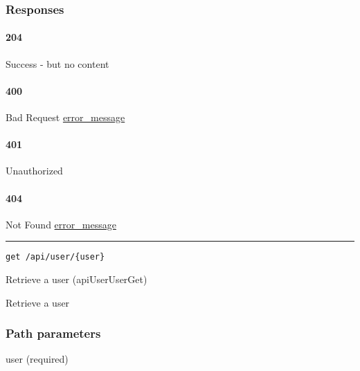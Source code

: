 \hypertarget{responses-129}{%
\subsubsection{Responses}\label{responses-129}}

\hypertarget{section-419}{%
\paragraph{204}\label{section-419}}

Success - but no content \protect\hyperlink{}{}

\hypertarget{section-420}{%
\paragraph{400}\label{section-420}}

Bad Request \protect\hyperlink{error_message}{error\_message}

\hypertarget{section-421}{%
\paragraph{401}\label{section-421}}

Unauthorized \protect\hyperlink{}{}

\hypertarget{section-422}{%
\paragraph{404}\label{section-422}}

Not Found \protect\hyperlink{error_message}{error\_message}

\begin{center}\rule{0.5\linewidth}{\linethickness}\end{center}

\protect\hypertarget{apiUserUserGet}{}{}

\begin{verbatim}
get /api/user/{user}
\end{verbatim}

Retrieve a user ({apiUserUserGet})

Retrieve a user

\hypertarget{path-parameters-68}{%
\subsubsection{Path parameters}\label{path-parameters-68}}

user (required)

